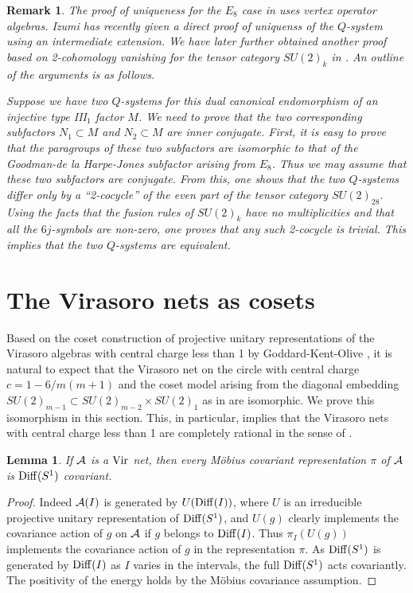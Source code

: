 \documentclass[12pt]{article}
\def\Diff{{\rm Diff}}
\def\Vir{{\rm Vir}}
\newtheorem{lemma}[theorem]{Lemma}
\newtheorem{remark}[theorem]{Remark}
\def\A{{\cal A}}
\begin{document}
\begin{remark}{\rm
The proof of uniqueness for the $E_8$ case in \cite[Section 6]{KO}
uses vertex operator algebras.  Izumi has recently given a direct
proof of uniquenss of the $Q$-system using an intermediate
extension.  We have later further obtained another proof based
on 2-cohomology vanishing for the tensor category $SU(2)_k$ in \cite{KL}.
An outline of the arguments is as follows.

Suppose we have two $Q$-systems for this dual canonical endomorphism
of an injective type III$_1$ factor $M$.  We need to prove that
the two corresponding subfactors $N_1\subset M$ and $N_2\subset M$
are inner conjugate.  First, it is easy to prove that the paragroups
of these two subfactors are isomorphic to that of the Goodman-de
la Harpe-Jones subfactor \cite[Section 4.5]{GHJ} arising from $E_8$.
Thus we may assume that these two subfactors are conjugate.  From
this, one shows that
the two $Q$-systems differ only by a ``2-cocycle'' of the even
part of the tensor category $SU(2)_{28}$.  Using the facts that
the fusion rules of $SU(2)_k$ have no multiplicities and that
all the $6j$-symbols are non-zero, one proves that any such 2-cocycle
is trivial.  This implies that the two $Q$-systems are equivalent.
}\end{remark}

\section{The Virasoro nets as cosets}
\label{Virasoro=coset}

Based on the coset construction of projective unitary representations of
the Virasoro algebras with central charge less than 1 by
Goddard-Kent-Olive \cite{GKO}, it is natural to expect that
the Virasoro net on the circle with central charge
$c=1-6/m(m+1)$ and the coset model arising from the diagonal
embedding $SU(2)_{m-1}\subset SU(2)_{m-2}\times SU(2)_1$
as in \cite{X4} are isomorphic.  We prove this isomorphism
in this section.  This, in particular, implies that the
Virasoro nets with central charge less than 1 are completely
rational in the sense of \cite{KLM}.

\begin{lemma}\label{diffeo1}
If $\A$ is a $\Vir$ net, then every M\"{o}bius covariant
representation $\pi$ of $\A$ is $\Diff(S^1)$ covariant.
\end{lemma}

\begin{proof}
Indeed $\A(I)$ is generated by
$U(\Diff(I))$, where $U$ is an irreducible projective unitary representation 
of $\Diff(S^1)$, and $U(g)$ clearly implements the covariance 
action of $g$ on $\A$ if $g$ belongs to $\Diff(I)$. 
Thus $\pi_I(U(g))$ implements the covariance action of $g$ in the 
representation $\pi$. 
As $\Diff(S^1)$ is generated by $\Diff(I)$ as $I$
varies in the intervals, the full $\Diff(S^1)$ acts covariantly.
The positivity of the energy holds by the M\"{o}bius covariance 
assumption.
\end{proof}
\end{document}
